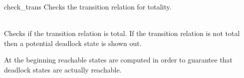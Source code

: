 \begin{nusmvCommand}{check\_trans} {Checks the transition relation for totality.}

\\

Checks if the transition relation is total. If the transition relation
is not total then a potential deadlock state is shown out.

\begin{cmdOpt}

            

\end{cmdOpt}
At the beginning reachable states are computed in order to guarantee
that deadlock states are actually reachable.

\end{nusmvCommand}

